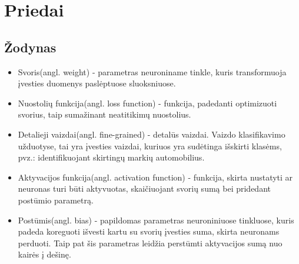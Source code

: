 \documentclass{VUMIFPSkursinis}
\begin{document}
\section{Priedai}
\thispagestyle{empty} 
\subsection{Žodynas}
\begin{itemize}
\item{Svoris(angl. weight) - parametras neuroniname tinkle, kuris transformuoja įvesties duomenys paslėptuose sluoksniuose.}
\item{Nuostolių funkcija(angl. loss function) - funkcija, padedanti optimizuoti svorius, taip sumažinant neatitikimų nuostolius.}
\item{Detalieji vaizdai(angl. fine-grained) - detalūs vaizdai. Vaizdo klasifikavimo užduotyse, tai yra įvesties vaizdai, kuriuos yra sudėtinga išskirti klasėms, pvz.: identifikuojant skirtingų markių automobilius.}
\item{Aktyvacijos funkcija(angl. activation function) - funkcija, skirta nustatyti ar neuronas turi būti aktyvuotas, skaičiuojant svorių sumą bei pridedant postūmio parametrą.}
\item{Postūmis(angl. bias) - papildomas parametras neuroniniuose tinkluose, kuris padeda koreguoti išvesti kartu su svorių įvesties suma, skirta neuronams perduoti. Taip pat šis parametras leidžia perstūmti aktyvacijos sumą nuo kairės į dešinę.}
\end{itemize} 
\pagebreak

\printbibliography[heading=bibintoc] 
\thispagestyle{empty}
\end{document}
